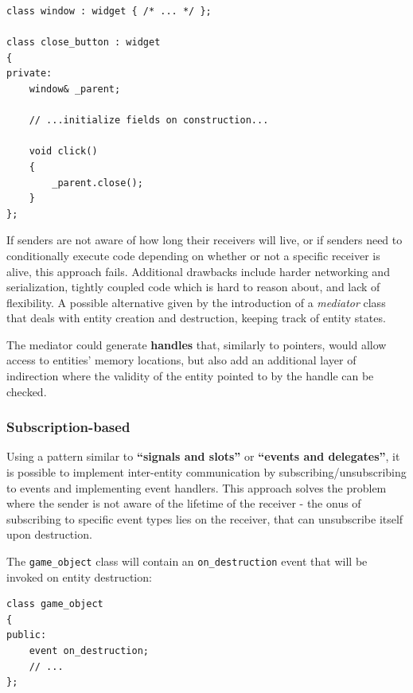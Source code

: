 \documentclass[twoside, 12pt, a4paper, openright]{book}
\begin{document}
\begin{verbatim}
class window : widget { /* ... */ };

class close_button : widget
{
private:
    window& _parent;

    // ...initialize fields on construction...

    void click()
    {
        _parent.close();
    }
};
\end{verbatim}

If senders are not aware of how long their receivers will live, or if
senders need to conditionally execute code depending on whether or not a
specific receiver is alive, this approach fails. Additional drawbacks
include harder networking and serialization, tightly coupled code which
is hard to reason about, and lack of flexibility. A possible alternative
given by the introduction of a \emph{mediator} class that deals with
entity creation and destruction, keeping track of entity states.

The mediator could generate \textbf{handles} that, similarly to
pointers, would allow access to entities' memory locations, but also add
an additional layer of indirection where the validity of the entity
pointed to by the handle can be checked.

\subsubsection{Subscription-based}\label{subscription-based}

Using a pattern similar to \textbf{``signals and slots''} or
\textbf{``events and delegates''}, it is possible to implement
inter-entity communication by subscribing/unsubscribing to events and
implementing event handlers. This approach solves the problem where the
sender is not aware of the lifetime of the receiver - the onus of
subscribing to specific event types lies on the receiver, that can
unsubscribe itself upon destruction.

The
\texttt{game_object}
class will contain an
\texttt{on_destruction}
event that will be invoked on entity destruction:

\begin{verbatim}
class game_object
{
public:
    event on_destruction;
    // ...
};
\end{verbatim}
\end{document}

